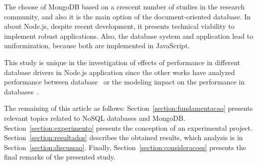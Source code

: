 \documentclass{svproc}
\begin{document}

The choose of MongoDB based on a crescent number of studies in the research community, and also it is the main option of the document-oriented database.
In about Node.js, despite recent development, it presents technical viability to implement robust applications.
Also, the database system and application lead to uniformization, because both are implemented in JavaScript.

This study is unique in the investigation of effects of performance in different database drivers in Node.js application since the other works have analyzed performance between database~\cite{jung:2015,patil:2017,ongo:2018} or the modeling impact on the performance in databases~\cite{kanade2014study}.

The remaining of this article as follows: Section~\ref{section:fundamentacao} presents relevant topics related to NoSQL databases and MongoDB. Section~\ref{section:experimento} presents the conception of an experimental project. Section~\ref{section:resultados} describes the obtained results, which analysis is in Section~\ref{section:discussao}. Finally, Section~\ref{section:consideracoes} presents the final remarks of the presented study.
\end{document}

